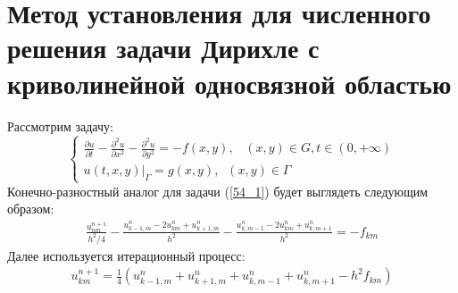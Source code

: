 


\section{Метод установления для численного решения задачи Дирихле с криволинейной односвязной областью}

Рассмотрим задачу:
\begin{equation}
\label{54_1}
\begin{cases}
\frac{\partial u}{\partial t}-\frac{\partial^2 u}{\partial x^2}-\frac{\partial^2 u}{\partial y^2} = -f(x,y),\;\;\;(x,y)\in G, t\in (0,+\infty)\\
u(t,x,y)|_\Gamma = g(x,y), \;\;(x,y)\in \Gamma
\end{cases}
\end{equation}
Конечно-разностный аналог для задачи (\ref{54_1}) будет выглядеть следующим образом:
\begin{gather*}
	\frac{u^{n+1}_{nm}}{h^2/4}-\frac{u^n_{k-1,m}-2u^n_{km}+u^n_{k+1,m}}{h^2}-\frac{u^n_{k,m-1}-2u^n_{km}+u^n_{k,m+1}}{h^2} = -f_{km}
\end{gather*}
Далее используется итерационный процесс:
\begin{gather*}
	u^{n+1}_{km}=\frac{1}{4}\left(u^n_{k-1,m}+u^n_{k+1,m}+u^n_{k,m-1}+u^n_{k,m+1}-h^2f_{km}\right)
\end{gather*}
